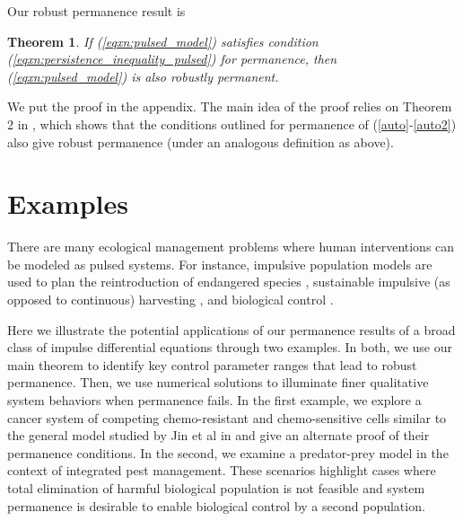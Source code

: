 \documentclass{article}
\newtheorem{theorem}{Theorem}[section]
\theoremstyle{definition}
\begin{document}
Our robust permanence result is 

\begin{theorem} \label{thm:robust_permanence}
    If (\ref{eqxn:pulsed_model}) satisfies condition (\ref{eqxn:persistence_inequality_pulsed}) for permanence, then (\ref{eqxn:pulsed_model}) is also robustly permanent. 
\end{theorem}

We put the proof in the appendix. The main idea of the proof relies on Theorem 2 in \cite{patel_schreiber_2018}, which shows that the conditions outlined for permanence of (\ref{auto}-\ref{auto2}) also give robust permanence (under an analogous definition as above).  

\section{Examples}
There are many ecological management problems where human interventions can be modeled as pulsed systems. For instance, impulsive population models are used to plan the reintroduction of endangered species \cite{xu_reintroduction_2016}, sustainable impulsive (as opposed to continuous) harvesting \cite{xu_harvesting_2005,yoshioka_unpulsed_ode_control_2024}, and biological control \cite{sentis_biocontrol_modeling_2022,mailleret_pulsed_biocontrol_2009}. 

Here we illustrate the potential applications of our permanence results of a broad class of impulse differential equations through two examples. In both, we use our main theorem to identify key control parameter ranges that lead to robust permanence.  Then, we use numerical solutions to illuminate finer qualitative system behaviors when permanence fails. In the first example, we explore a cancer system of competing chemo-resistant and chemo-sensitive cells similar to the general model studied by Jin et al in \cite{jin_persistence_2005} and give an alternate proof of their permanence conditions. In the second, we examine a predator-prey model in the context of integrated pest management. These scenarios highlight cases where total elimination of harmful biological population is not feasible and system permanence is desirable to enable biological control by a second population.
\end{document}
